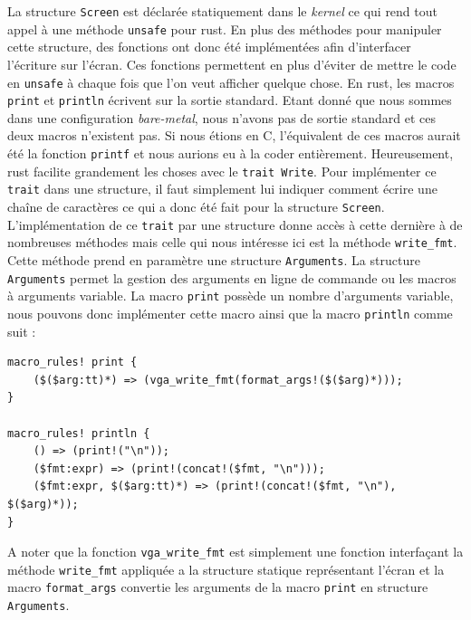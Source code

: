 La structure \texttt{Screen} est déclarée statiquement dans le \textit{kernel}
ce qui rend tout appel à une méthode \texttt{unsafe} pour rust. En plus
des méthodes pour manipuler cette structure, des fonctions ont donc été implémentées
afin d'interfacer l'écriture sur l'écran. Ces fonctions permettent en plus d'éviter
de mettre le code en \texttt{unsafe} à chaque fois que l'on veut afficher
quelque chose. En rust, les macros \texttt{print} et \texttt{println}
écrivent sur la sortie standard. Etant donné que nous sommes dans une configuration
\textit{bare-metal}, nous n'avons pas de sortie standard et ces deux macros n'existent
pas. Si nous étions en C, l'équivalent de ces macros aurait été la fonction
\texttt{printf} et nous aurions eu à la coder entièrement. Heureusement,
rust facilite grandement les choses avec le \texttt{trait Write}.
Pour implémenter ce \texttt{trait} dans une structure, il faut simplement
lui indiquer comment écrire une chaîne de caractères ce qui a donc été fait
pour la structure \texttt{Screen}. L'implémentation de ce \texttt{trait}
par une structure donne accès à cette dernière à de nombreuses méthodes mais celle
qui nous intéresse ici est la méthode \texttt{write_fmt}. Cette méthode
prend en paramètre une structure \texttt{Arguments}. La structure
\texttt{Arguments} permet la gestion des arguments en ligne de commande
ou les macros à arguments variable. La macro \texttt{print} possède
un nombre d'arguments variable, nous pouvons donc implémenter cette macro ainsi
que la macro \texttt{println} comme suit :

\begin{verbatim}
macro_rules! print {
    ($($arg:tt)*) => (vga_write_fmt(format_args!($($arg)*)));
}

macro_rules! println {
    () => (print!("\n"));
    ($fmt:expr) => (print!(concat!($fmt, "\n")));
    ($fmt:expr, $($arg:tt)*) => (print!(concat!($fmt, "\n"), $($arg)*));
}
\end{verbatim}

A noter que la fonction \texttt{vga_write_fmt} est simplement une fonction
interfaçant la méthode \texttt{write_fmt} appliquée a la structure
statique représentant l'écran et la macro \texttt{format_args} convertie
les arguments de la macro \texttt{print} en structure \texttt{Arguments}.

